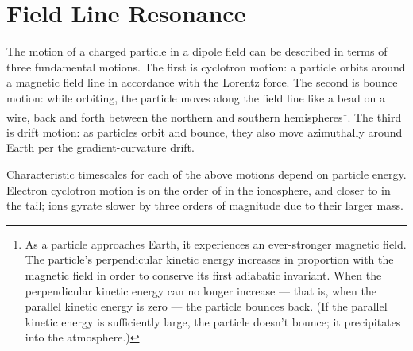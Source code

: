 


\chapter{Field Line Resonance}
  \label{ch_flrs}



The motion of a charged particle in a dipole field can be described in terms of three fundamental motions. The first is cyclotron motion: a particle orbits around a magnetic field line in accordance with the Lorentz force. The second is bounce motion: while orbiting, the particle moves along the field line like a bead on a wire, back and forth between the northern and southern hemispheres\footnote{As a particle approaches Earth, it experiences an ever-stronger magnetic field. The particle's perpendicular kinetic energy increases in proportion with the magnetic field in order to conserve its first adiabatic invariant. When the perpendicular kinetic energy can no longer increase --- that is, when the parallel kinetic energy is zero --- the particle bounces back. (If the parallel kinetic energy is sufficiently large, the particle doesn't bounce; it precipitates into the atmosphere.)}. The third is drift motion: as particles orbit and bounce, they also move azimuthally around Earth per the gradient-curvature drift. 

Characteristic timescales for each of the above motions depend on particle energy. Electron cyclotron motion is on the order of \todo{$\cdots$} in the ionosphere, and closer to \todo{$\cdots$} in the tail; ions gyrate slower by three orders of magnitude due to their larger mass. 




